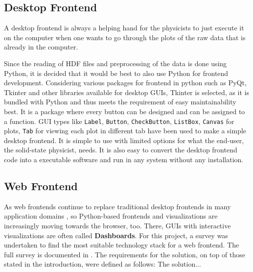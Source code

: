 \subsection{Desktop Frontend}
\label{sec:desktop-frontend}

A desktop frontend is always a helping hand for the physicists to just execute
it on the computer when one wants to go through the plots of the raw data that
is already in the computer.

Since the reading of HDF files and preprocessing of the data is done using
Python, it is decided that it would be best to also use Python for frontend
development. Considering various packages for frontend in python such as PyQt,
Tkinter and other libraries available for desktop GUIs, Tkinter is selected, as
it is bundled with Python and thus meets the requirement of easy maintainability
best. It is a package where every button can be designed and can be assigned to
a function. GUI types like \texttt{Label}, \texttt{Button},
\texttt{CheckButton}, \texttt{ListBox}, \texttt{Canvas} for plots, \texttt{Tab}
for viewing each plot in different tab have been used to make a simple desktop
frontend. It is simple to use with limited options for what the end-user, the
solid-state physicist, needs. It is also easy to convert the desktop frontend
code into a executable software and run in any system without any installation.

\subsection{Web Frontend}
\label{sec:web-frontend}

As web frontends continue to replace traditional desktop frontends in many
application domains \cite{web-vs-desktop}, so Python-based frontends and
visualizations are increasingly moving towards the browser, too. There, GUIs
with interactive visualizations are often called \textbf{Dashboards}. For this
project, a survey was undertaken to find the most suitable technology stack for
a web frontend. The full survey is documented in \cite{jw-notes}. The
requirements for the solution, on top of those stated in the introduction, were
defined as follows: The solution...

